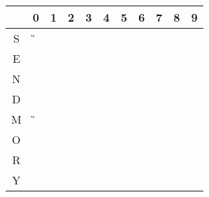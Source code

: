 \begin{tabular}{|c|c|c|c|c|c|c|c|c|c|c|}\hline
  & 0 & 1 & 2 & 3 & 4 & 5 & 6 & 7 & 8 & 9 \\ \hline
S &\G &\X &\X &\X &\X &\X &\X &\X &\X &\F \\ \hline
E &   &   &   &   &   &   &   &   &   &   \\ \hline
N &   &   &   &   &   &   &   &   &   &   \\ \hline
D &   &   &   &   &   &   &   &   &   &   \\ \hline
M &\G &\F &\X &\X &\X &\X &\X &\X &\X &\X \\ \hline
O &   &   &\R &\R &\R &\R &\R &\R &\R &\R \\ \hline
R &   &   &   &   &   &   &   &   &   &   \\ \hline
Y &   &   &   &   &   &   &   &   &   &   \\ \hline
\end{tabular}
